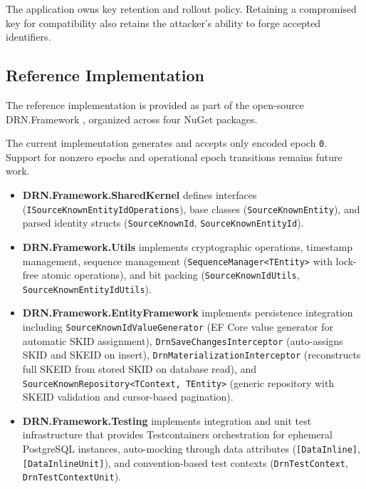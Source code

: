 \documentclass[a4paper,fleqn]{cas-sc}
\providecommand{\tightlist}{%
  \setlength{\itemsep}{0pt}\setlength{\parskip}{0pt}}
\begin{document}
The application owns key retention and rollout policy. Retaining a
compromised key for compatibility also retains the attacker's ability to
forge accepted identifiers.

\subsection{Reference Implementation}\label{reference-implementation}

The reference implementation is provided as part of the open-source
DRN.Framework \citep{drn-project}, organized across four NuGet packages.

The current implementation generates and accepts only encoded epoch
\texttt{0}. Support for nonzero epochs and operational epoch transitions
remains future work.

\begin{itemize}
\tightlist
\item
  \textbf{DRN.Framework.SharedKernel} defines interfaces
  (\texttt{ISourceKnownEntityIdOperations}), base classes
  (\texttt{SourceKnownEntity}), and parsed identity structs
  (\texttt{SourceKnownId}, \texttt{SourceKnownEntityId}).
\item
  \textbf{DRN.Framework.Utils} implements cryptographic operations,
  timestamp management, sequence management
  (\texttt{SequenceManager\textless{}TEntity\textgreater{}} with
  lock-free atomic operations), and bit packing
  (\texttt{SourceKnownIdUtils}, \texttt{SourceKnownEntityIdUtils}).
\item
  \textbf{DRN.Framework.EntityFramework} implements persistence
  integration including \texttt{SourceKnownIdValueGenerator} (EF Core
  value generator for automatic SKID assignment),
  \texttt{DrnSaveChangesInterceptor} (auto-assigns SKID and SKEID on
  insert), \texttt{DrnMaterializationInterceptor} (reconstructs full
  SKEID from stored SKID on database read), and
  \texttt{SourceKnownRepository\textless{}TContext,\ TEntity\textgreater{}}
  (generic repository with SKEID validation and cursor-based
  pagination).
\item
  \textbf{DRN.Framework.Testing} implements integration and unit test
  infrastructure that provides Testcontainers orchestration for
  ephemeral PostgreSQL instances, auto-mocking through data attributes
  (\texttt{{[}DataInline{]}}, \texttt{{[}DataInlineUnit{]}}), and
  convention-based test contexts (\texttt{DrnTestContext},
  \texttt{DrnTestContextUnit}).
\end{itemize}
\end{document}
